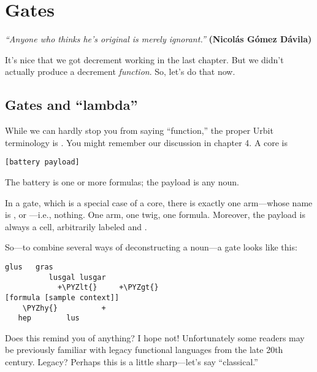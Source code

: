 \chapter{Gates}

\emph{``Anyone who thinks he's original is merely ignorant.''}
\textbf{(Nicolás Gómez Dávila)}

It's nice that we got decrement working in the last chapter.  But
we didn't actually produce a decrement \emph{function}.  So, let's do
that now.

\section{Gates and ``lambda''}

While we can hardly stop you from saying ``function,'' the proper
Urbit terminology is .  You might remember our discussion
in chapter 4.  A core is

\begin{framed_shaded}
\begin{Verbatim}[fontsize=\relsize{-2.5},fontseries=b,commandchars=\\\{\}]
[battery payload]
\end{Verbatim}
\end{framed_shaded}
The battery is one or more formulas; the payload is any noun.  

In a gate, which is a special case of a core, there is exactly
one arm---whose name is \kode{\$},  or ---i.e., nothing.  One
arm, one twig, one formula.  Moreover, the payload is always a 
cell, arbitrarily labeled  and .  

So---to combine several ways of deconstructing a noun---a gate
looks like this:

\begin{framed_shaded}
\begin{Verbatim}[fontsize=\relsize{-2.5},fontseries=b,commandchars=\\\{\}]
           glus   gras
          lusgal lusgar
            +\PYZlt{}     +\PYZgt{}
[formula [sample context]]
    \PYZhy{}          +
   hep        lus
\end{Verbatim}
\end{framed_shaded}
Does this remind you of anything?  I hope not!  Unfortunately
some readers may be previously familiar with legacy functional
languages from the late 20th century.  Legacy?  Perhaps this is a
little sharp---let's say ``classical.''

